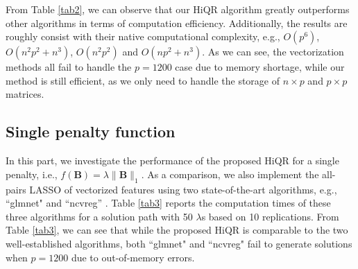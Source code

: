 \documentclass[preprint,authoryear,11pt]{elsarticle}
\newcommand{\B}{\mathbf B}
\begin{document}
\begin{table}[!htbp] \centering 
	\caption{Average computation time (standard deviation) of different algorithms for ridge regression ($\lambda=10$) over 10 replications. Time is recorded in seconds.  } 
	\label{tab2} 
  \end{table} 

From Table \ref{tab2}, we can observe that our HiQR algorithm greatly outperforms other algorithms in terms of computation efficiency.  Additionally, the results are roughly consist with their native computational complexity, e.g., $O(p^6)$, $O(n^2p^2+n^3)$, $O(n^2p^2)$ and $O(np^2+n^3)$. As we can see, the vectorization methods all fail to handle the $p=1200$ case due to   memory shortage, while our method is still efficient, as we only need to handle the storage of $n \times p$ and $p \times p$ matrices.     

\subsection{Single penalty function}
In this part, we investigate the performance of the proposed HiQR for a single penalty, i.e., $f(\B)=\lambda \|\B\|_1$. As a comparison, we also implement the all-pairs LASSO of vectorized features using two state-of-the-art algorithms, e.g., ``glmnet" \citep{friedman2010regularization} and ``ncvreg'' \citep{breheny2011coordinate}. Table \ref{tab3} reports the computation times of these three algorithms for a solution path with 50 $\lambda$s based on 10 replications. From Table \ref{tab3}, we can see that while the proposed HiQR is comparable to the two well-established algorithms, both ``glmnet" and ``ncvreg" fail to generate solutions when $p=1200$ due to out-of-memory errors.
\end{document}
